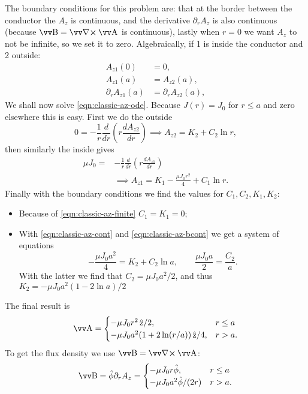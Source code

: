 \documentclass[margin=small]{tex/hsrzf}
\theoremstyle{elmagzf}
\begin{document}
The boundary conditions for this problem are: that at the border between the conductor the
\(A_z\) is continuous, and the derivative \(\partial_r A_z\) is also continuous
(because \(\vec{B} = \curl \vec{A}\) is continuous), lastly when \(r = 0\) we
want \(A_z\) to not be infinite, so we set it to zero.  Algebraically, if 1 is
inside the conductor and 2 outside:
\begin{subequations}
  \begin{align}
    A_{z1} (0) &= 0 , \label{eqn:classic-az-finite} \\
    A_{z1} (a) &= A_{z2} (a) , \label{eqn:classic-az-cont} \\
    \partial_r A_{z1} (a) &= \partial_r A_{z2} (a) , \label{eqn:classic-az-bcont}
  \end{align}
\end{subequations}
We shall now solve \eqref{eqn:classic-az-ode}. Because \(J(r) = J_0\) for \(r \leq
a\) and zero elsewhere this is easy. First we do the outside
\[
  0 = -\frac{1}{r} \frac{d}{dr} \left( r \frac{dA_{z2}}{dr} \right)
  \implies A_{z2} = K_2 + C_2 \ln r,
\]
then similarly the inside gives
\begin{align*}
  \mu J_0 = & -\frac{1}{r} \frac{d}{dr} \left( r \frac{dA_{z1}}{dr} \right) \\
  &\implies A_{z1} = K_1 - \frac{\mu J_0 r^2}{4} + C_1 \ln r .
\end{align*}
Finally with the boundary conditions we find the values for \(C_1, C_2, K_1,
K_2\):
\begin{itemize}
  \item Because of \eqref{eqn:classic-az-finite} \(C_1 = K_1 = 0\);
  \item With \eqref{eqn:classic-az-cont} and \eqref{eqn:classic-az-bcont} we get
    a system of equations
    \[
      -\frac{\mu J_0 a^2}{4} = K_2 + C_2 \ln a, \qquad
      \frac{\mu J_0 a}{2} = \frac{C_2}{a}.
    \]
    With the latter we find that \(C_2 = \mu J_0 a^2 / 2\), and thus
    \(K_2 = -\mu J_0 a^2 (1 - 2\ln a) / 2\)
\end{itemize}
The final result is 
\begin{align*}
  \vec{A} = \begin{cases}
    -\mu J_0 r^2 \, \uvec{z} / 2 ,                   & r \leq a \\
    -\mu J_0 a^2 (1 + 2 \ln (r/a)) \, \uvec{z} / 4 , & r > a.   \\
  \end{cases}
\end{align*}
To get the flux density we use \(\vec{B} = \curl \vec{A}\):
\[
  \vec{B} = \uvec{\phi} \partial_r A_z = \begin{cases}
    -\mu J_0 r \uvec{\phi}, & r \leq a \\
    -\mu J_0 a^2 \uvec{\phi} / (2r) & r > a .\\
  \end{cases}
\]
\end{document}
